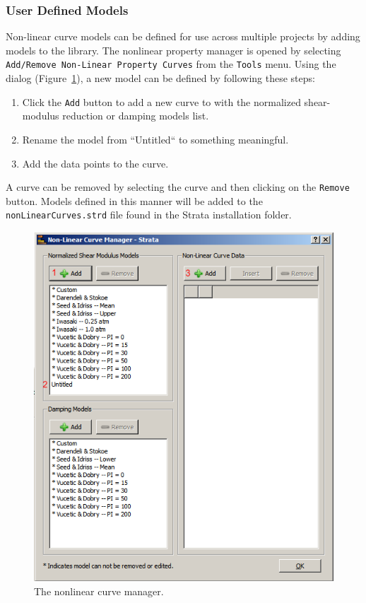 \documentclass[12pt,oneside]{book}
\begin{document}
\subsubsection{User Defined Models}
Non-linear curve models can be defined for use across multiple projects by adding models to the
library.  The nonlinear property manager is opened by selecting \texttt{Add/Remove Non-Linear
Property Curves} from the \texttt{Tools} menu.  Using the dialog
(Figure~\ref{fig:strata:nonLinearCurveManager}), a new model can be defined by following these
steps:
\begin{enumerate}
    \item Click the \texttt{Add} button to add a new curve to with the normalized shear-modulus
        reduction or damping models list.
    \item Rename the model from ``Untitled`` to something meaningful.
    \item Add the data points to the curve.
\end{enumerate}
A curve can be removed by selecting the curve and then clicking on the \texttt{Remove} button.
Models defined in this manner will be added to the \texttt{nonLinearCurves.strd} file found in the
Strata installation folder.

\begin{figure}[p]
    \begin{center}
        \includegraphics[width=\linewidth]{figures/strata/nonLinearPropertyManager.png}
    \end{center}
    \caption{The nonlinear curve manager.}
    \label{fig:strata:nonLinearCurveManager}
\end{figure}
\end{document}
